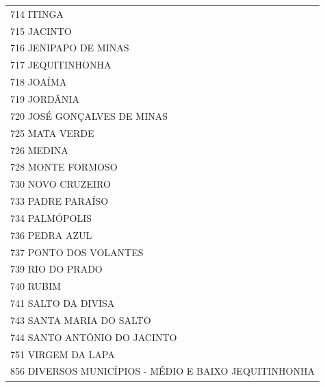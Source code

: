 \documentclass{article}
\begin{document}
\begin{longtable}[c]{m{18cm}}
\multicolumn{1}{l}{ \hspace{2em} 714 ITINGA } \\
\multicolumn{1}{l}{ \hspace{2em} 715 JACINTO } \\
\multicolumn{1}{l}{ \hspace{2em} 716 JENIPAPO DE MINAS } \\
\multicolumn{1}{l}{ \hspace{2em} 717 JEQUITINHONHA } \\
\multicolumn{1}{l}{ \hspace{2em} 718 JOAÍMA } \\
\multicolumn{1}{l}{ \hspace{2em} 719 JORDÂNIA } \\
\multicolumn{1}{l}{ \hspace{2em} 720 JOSÉ GONÇALVES DE MINAS } \\
\multicolumn{1}{l}{ \hspace{2em} 725 MATA VERDE } \\
\multicolumn{1}{l}{ \hspace{2em} 726 MEDINA } \\
\multicolumn{1}{l}{ \hspace{2em} 728 MONTE FORMOSO } \\
\multicolumn{1}{l}{ \hspace{2em} 730 NOVO CRUZEIRO } \\
\multicolumn{1}{l}{ \hspace{2em} 733 PADRE PARAÍSO } \\
\multicolumn{1}{l}{ \hspace{2em} 734 PALMÓPOLIS } \\
\multicolumn{1}{l}{ \hspace{2em} 736 PEDRA AZUL } \\
\multicolumn{1}{l}{ \hspace{2em} 737 PONTO DOS VOLANTES } \\
\multicolumn{1}{l}{ \hspace{2em} 739 RIO DO PRADO } \\
\multicolumn{1}{l}{ \hspace{2em} 740 RUBIM } \\
\multicolumn{1}{l}{ \hspace{2em} 741 SALTO DA DIVISA } \\
\multicolumn{1}{l}{ \hspace{2em} 743 SANTA MARIA DO SALTO } \\
\multicolumn{1}{l}{ \hspace{2em} 744 SANTO ANTÔNIO DO JACINTO } \\
\multicolumn{1}{l}{ \hspace{2em} 751 VIRGEM DA LAPA } \\
\multicolumn{1}{l}{ \hspace{2em} 856 DIVERSOS MUNICÍPIOS - MÉDIO E BAIXO JEQUITINHONHA } \\
\end{longtable}
\end{document}
